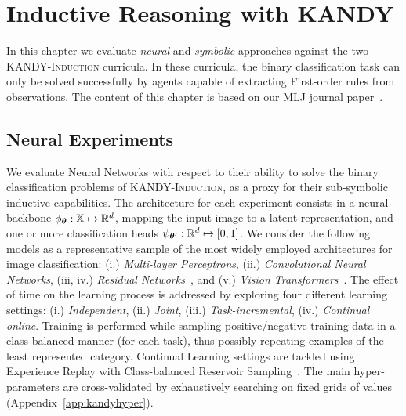 \chapter{Inductive Reasoning with \textsc{KANDY}}\label{chap:kandyind}
In this chapter we evaluate {\it neural} and {\it symbolic} approaches against the two \textsc{KANDY-Induction} curricula. In these curricula, the binary classification task can only be solved successfully by agents capable of extracting First-order rules from observations.
The content of this chapter is based on our MLJ journal paper~\cite{lorello2025kandy}.

\section{Neural Experiments}\label{sec:kandy:neur-exp}
We evaluate Neural Networks with respect to their ability to solve the binary classification problems of \textsc{KANDY-Induction}, as a proxy for their sub-symbolic inductive capabilities. The architecture for each experiment consists in a neural backbone $\phi_{\bm{\theta}}: {\mathbb{X}} \mapsto \mathbb{R}^d$, mapping the input image to a latent representation, and one or more classification heads $\psi_{{\bm{\theta}}'}: \mathbb{R}^d \mapsto [0, 1]$.
We consider the following models as a representative sample of the most widely employed architectures for image classification: (i.) \textit{Multi-layer Perceptrons}, (ii.) \textit{Convolutional Neural Networks}, (iii, iv.) \textit{Residual Networks}~\cite{he2016deep}, and (v.) \textit{Vision Transformers}~\cite{dosovitskiy2020image}.
The effect of time on the learning process is addressed by exploring four different learning settings: (i.) \textit{Independent}, (ii.) \textit{Joint}, (iii.) \textit{Task-incremental}, (iv.) \textit{Continual online}.
Training is performed while sampling positive/negative training data in a class-balanced manner (for each task), thus possibly repeating examples of the least represented category. 
Continual Learning settings are tackled using Experience Replay with Class-balanced Reservoir Sampling~\cite{chrysakis2020online}. The main hyper-parameters are cross-validated by exhaustively searching on fixed grids of values (Appendix~\ref{app:kandyhyper}).

